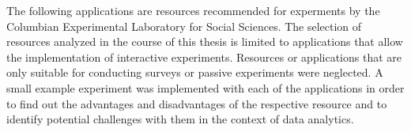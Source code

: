 


The following applications are resources recommended for experments by the Columbian Experimental Laboratory for Social Sciences. The selection of resources analyzed in the course of this thesis is limited to applications that allow the implementation of interactive experiments. Resources or applications that are only suitable for conducting surveys or passive experiments were neglected. A small example experiment was implemented with each of the applications in order to find out the advantages and disadvantages of the respective resource and to identify potential challenges with them in the context of data analytics.

